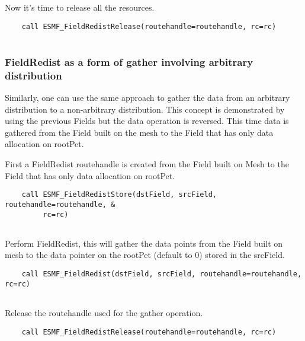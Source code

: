    Now it's time to release all the resources. 

 \begin{verbatim}
    call ESMF_FieldRedistRelease(routehandle=routehandle, rc=rc)
 
\end{verbatim}
 

   \subsubsection{FieldRedist as a form of gather involving arbitrary distribution}
   \label{sec:field:usage:redist_gathering}
  
   Similarly, one can use the same approach to gather the data from an arbitrary distribution
   to a non-arbitrary distribution. This concept is demonstrated by using the previous Fields but 
   the data operation is reversed. This time data is gathered from the Field built on the mesh to the Field
   that has only data allocation on rootPet.
   

   First a FieldRedist routehandle is created from the Field built on Mesh to the Field
   that has only data allocation on rootPet. 

 \begin{verbatim}
    call ESMF_FieldRedistStore(dstField, srcField, routehandle=routehandle, &
         rc=rc)
 
\end{verbatim}
 

   Perform FieldRedist, this will gather the data points from the Field built on mesh to
   the data pointer on the rootPet (default to 0) stored in the srcField. 

 \begin{verbatim}
    call ESMF_FieldRedist(dstField, srcField, routehandle=routehandle, rc=rc)
 
\end{verbatim}
 

   Release the routehandle used for the gather operation. 

 \begin{verbatim}
    call ESMF_FieldRedistRelease(routehandle=routehandle, rc=rc)
 
\end{verbatim}

\setlength{\parskip}{\oldparskip}
\setlength{\parindent}{\oldparindent}
\setlength{\baselineskip}{\oldbaselineskip}
